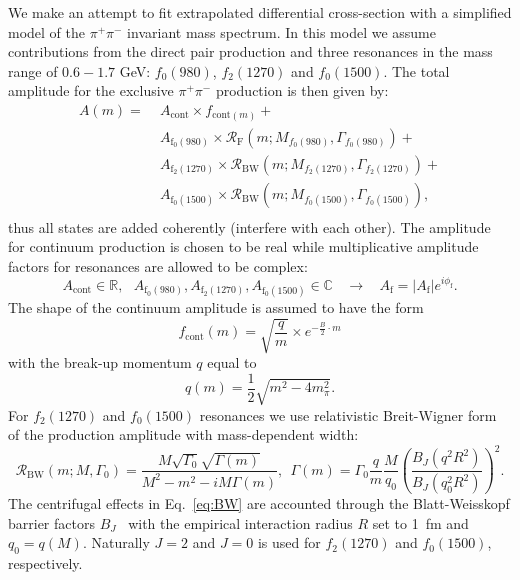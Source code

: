 We make an attempt to fit extrapolated differential cross-section with a simplified model of the $\pi^{+}\pi^{-}$ invariant mass spectrum. In this model we assume contributions from the direct pair production and three resonances in the mass range of $0.6-1.7$ GeV: $f_0(980)$, $f_2(1270)$ and $f_0(1500)$. The total amplitude for the exclusive $\pi^{+}\pi^{-}$ production is then given by:
%
\begin{equation}
\label{eq:amplitude}
\begin{aligned}
A(m) = & \;A_{\textrm{cont}}\times f_{\textrm{cont}(m)}+ \\
        & \;A_{\textrm{f}_0(980)} \times \mathcal{R}_{\textrm{F}}\left(m;M_{f_0(980)},\Gamma_{f_0(980)}\right)+ \\
        & \;A_{\textrm{f}_2(1270)} \times \mathcal{R}_{\textrm{BW}}\left(m;M_{f_2(1270)},\Gamma_{f_2(1270)}\right) +\\
        & \;A_{\textrm{f}_0(1500)} \times \mathcal{R}_{\textrm{BW}}\left(m;M_{f_0(1500)},\Gamma_{f_0(1500)}\right),\\
\end{aligned}
\end{equation}
%
thus all states are added coherently (interfere with each other). The amplitude for continuum production is chosen to be real while multiplicative amplitude factors for resonances are allowed to be complex:
\begin{equation}A_{\textrm{cont}}\in\mathbb{R},~~~A_{\textrm{f}_0(980)},A_{\textrm{f}_2(1270)},A_{\textrm{f}_0(1500)}\in\mathbb{C}~~~~\rightarrow~~~~A_{\textrm{f}}=|A_{\textrm{f}}|e^{i\phi_{\textrm{f}}}.\end{equation}
%
The shape of the continuum amplitude is assumed to have the form
\begin{equation}f_{\textrm{cont}}(m) = \sqrt{\frac{q}{m}}\times e^{-\frac{B}{2}\cdot m}\end{equation}
with the break-up momentum $q$ equal to
\begin{equation}\label{eq:breakupMom}
q(m) = \frac{1}{2}\sqrt{m^{2}-4m_{\pi}^{2}}.
\end{equation}
For $f_2(1270)$ and $f_0(1500)$ resonances we use relativistic Breit-Wigner form of the production amplitude with mass-dependent width:
\begin{equation}\label{eq:BW}\mathcal{R}_{\textrm{BW}}(m;M,\Gamma_{0}) = \frac{M\sqrt{\Gamma_{0}}\sqrt{\Gamma(m)}}{M^{2}-m^{2}-i M\Gamma(m)},~~\Gamma(m) = \Gamma_{0}\frac{q}{m}\frac{M}{q_{0}}\left(\frac{B_{J}(q^{2}R^{2})}{B_{J}(q_{0}^{2}R^{2})}\right)^{2}.\end{equation}
The centrifugal effects in Eq.~\eqref{eq:BW} are accounted through the Blatt-Weisskopf barrier factors $B_{J}$~\cite{BarrierFactors} with the empirical interaction radius $R$ set to 1~fm and $q_{0} = q(M)$. Naturally $J=2$ and $J=0$ is used for $f_2(1270)$ and $f_0(1500)$, respectively.

